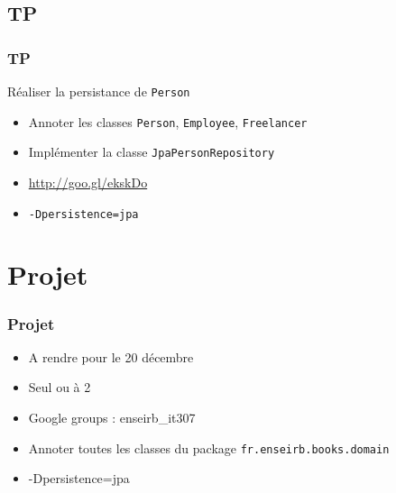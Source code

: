 \documentclass[t,12pt]{beamer}
\begin{document}
\subsection{TP}
\begin{frame}
	\frametitle{TP}

	\begin{block}{R\'ealiser la persistance de \lstinline{Person}}
		\begin{itemize}
			\item Annoter les classes \lstinline{Person}, \lstinline{Employee}, \lstinline{Freelancer}
			\item Impl\'ementer la classe \lstinline{JpaPersonRepository}
			\item \url{http://goo.gl/ekskDo}
			\item \lstinline{-Dpersistence=jpa}
		\end{itemize}
	\end{block}

\end{frame}

\section{Projet}

\begin{frame}
	\frametitle{Projet}

	\begin{block}{}
		\begin{itemize}
			\item A rendre pour le 20 d\'ecembre
			\item Seul ou \`a 2
			\item Google groups : enseirb\_it307
			\item Annoter toutes les classes du package \lstinline{fr.enseirb.books.domain}
			\item -Dpersistence=jpa
		\end{itemize}
	\end{block}
\end{frame}
\end{document}
